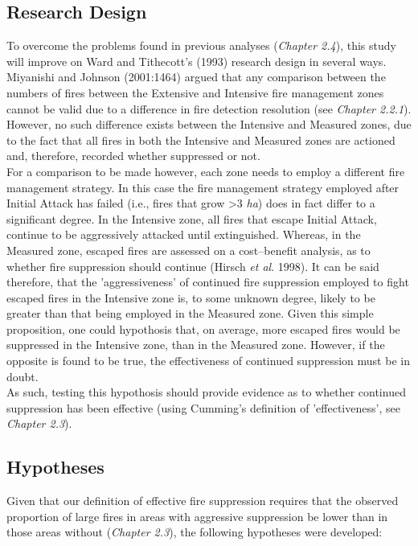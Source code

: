 \begin{spacing}{1.5}
\phantom
\phantom
\phantom
\phantom
\section{Research Design}
\phantom
\phantom
To overcome the problems found in previous analyses (\emph{Chapter 2.4}), this study will improve on Ward and Tithecott's (1993) research design in several ways. \\

\noindent Miyanishi and Johnson (2001:1464) argued that any comparison between the numbers of fires between the Extensive and Intensive fire management zones cannot be valid due to a difference in fire detection resolution (see \emph{Chapter 2.2.1}). However, no such difference exists between the Intensive and Measured zones, due to the fact that all fires in both the Intensive and Measured zones are actioned and, therefore, recorded whether suppressed or not. \\

\noindent For a comparison to be made however, each zone needs to employ a different fire management strategy. In this case the fire management strategy employed after Initial Attack has failed (i.e., fires that grow >3 \emph{ha}) does in fact differ to a significant degree. In the Intensive zone, all fires that escape Initial Attack, continue to be aggressively attacked until extinguished. Whereas, in the Measured zone, escaped fires are assessed on a cost--benefit analysis, as to whether fire suppression should continue (Hirsch \emph{et al}. 1998). It can be said therefore, that the 'aggressiveness' of continued fire suppression  employed to fight escaped fires in the Intensive zone is, to some unknown degree, likely to be greater than that being employed in the Measured zone. Given this simple proposition, one could hypothosis that, on average, more escaped fires would be suppressed in the Intensive zone, than in the Measured zone. However, if the opposite is found to be true, the effectiveness of continued suppression must be in doubt. \\

\noindent As such, testing this hypothosis should provide evidence as to whether continued suppression has been effective (using Cumming's definition of 'effectiveness', see \emph{Chapter 2.3}).

\subsection{Hypotheses}
Given that our definition of effective fire suppression requires that the observed proportion of large fires in areas with aggressive suppression be lower than in those areas without (\emph{Chapter 2.3}), the following hypotheses were developed: \\


\end{spacing}
